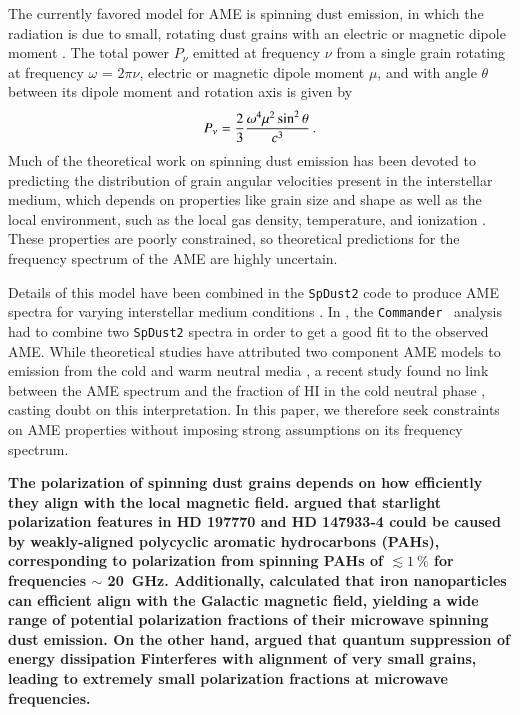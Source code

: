 \documentclass[twocolumn]{aa}
\def\commander{\texttt{Commander}}
\begin{document}
The currently favored model for AME is spinning dust emission, in which the radiation is due to small, rotating dust grains with an electric or magnetic dipole moment \citep{draine1998_2}. The total power $P_{\nu}$ emitted at frequency $\nu$ from a single grain rotating at frequency $\omega$ = $2\pi\nu$, electric or magnetic dipole moment $\mu$, and with angle $\theta$ between its dipole moment and rotation axis is given by
\begin{equation}
\centering
P_{\nu} = \frac{2}{3} \frac{\omega^4 \mu^2 \sin^2 \theta}{c^3} \, .
\label{eq:larmor}
\end{equation}
 Much of the theoretical work on spinning dust emission has been devoted to predicting the distribution of grain angular velocities present in the interstellar medium, which depends on properties like grain size and shape as well as the local environment, such as the local gas density, temperature, and ionization \citep{draine1998_2,hoang2010,silsbee:2011}. These properties are poorly constrained, so theoretical predictions for the frequency spectrum of the AME are highly uncertain. 
 
Details of this model have been combined in the \texttt{SpDust2} code to produce AME spectra for varying interstellar medium conditions \citep{hoang2010,silsbee:2011}. In \cite{planck2014-a11}, the \commander\ \citep{eriksen2008} analysis had to combine two \texttt{SpDust2} spectra in order to get a good fit to the observed AME. While theoretical studies have attributed two component AME models to emission from the cold and warm neutral media \citep{hoang2010,ysard+}, a recent study found no link between the AME spectrum and the fraction of HI in the cold neutral phase \citep{Hensley21}, casting doubt on this interpretation. In this paper, we therefore seek constraints on AME properties without imposing strong assumptions on its frequency spectrum.

\textbf{The polarization of spinning dust grains depends on how efficiently they align with the local magnetic field. \cite{hoang2013} argued that starlight polarization features in HD 197770 and HD 147933-4 could be caused by weakly-aligned polycyclic aromatic hydrocarbons (PAHs), corresponding to polarization from spinning PAHs of $\lesssim 1~\%$ for frequencies $\sim$ 20~GHz. Additionally, \cite{hoang2016} calculated that iron nanoparticles can efficient align with the Galactic magnetic field, yielding a wide range of potential polarization fractions of their microwave spinning dust emission. On the other hand, \cite{draine2016} argued that quantum suppression of energy dissipation Finterferes with alignment of very small grains, leading to extremely small polarization fractions at microwave frequencies.}
\end{document}
